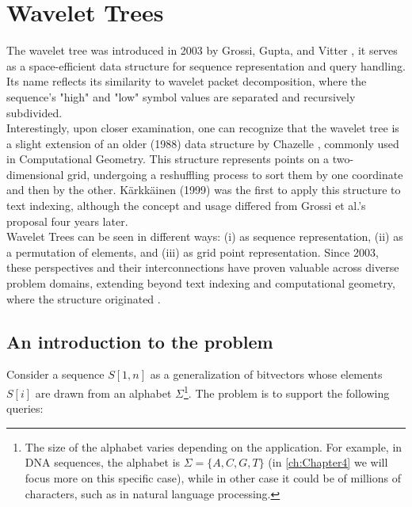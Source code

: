 \clearpage
\section{Wavelet Trees}

The wavelet tree was introduced in 2003 by Grossi, Gupta, and Vitter \cite{GrossiWT2003}, it serves as a space-efficient data structure for sequence representation and query handling. Its name reflects its similarity to wavelet packet decomposition, where the sequence's "high" and "low" symbol values are separated and recursively subdivided. \\

\noindent Interestingly, upon closer examination, one can recognize that the wavelet tree is a slight extension of an older (1988) data structure by Chazelle \cite{Chazelle1988}, commonly used in Computational Geometry. This structure represents points on a two-dimensional grid, undergoing a reshuffling process to sort them by one coordinate and then by the other. Kärkkäinen (1999) \cite{karkkainen1999repetition} was the first to apply this structure to text indexing, although the concept and usage differed from Grossi et al.'s proposal four years later. \\

\noindent Wavelet Trees can be seen in different ways: (i) as sequence representation, (ii) as a permutation of elements, and (iii) as grid point representation. Since 2003, these perspectives and their interconnections have proven valuable across diverse problem domains, extending beyond text indexing and computational geometry, where the structure originated \cite{WTForALL,WTFromTheoryToPractice,TheMyriadVirtuesWT}.

\subsection*{An introduction to the problem}
Consider a sequence $S[1,n]$ as a generalization of bitvectors whose elements $S[i]$ are drawn from an alphabet $\Sigma$\footnote{The size of the alphabet varies depending on the application. For example, in DNA sequences, the alphabet is $\Sigma = \{A,C,G,T\}$ (in \autoref{ch:Chapter4} we will focus more on this specific case), while in other case it could be of millions of characters, such as in natural language processing.}. The problem is to support the following queries:


